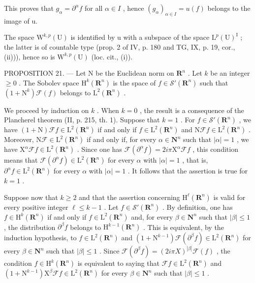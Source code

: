 This proves that \(g_{\alpha} = \partial^{\alpha} f\) for all \(\alpha \in I\) , hence \((g_{\alpha})_{\alpha \in I} = u(f)\) belongs to the image of u.

The space \(\mathrm{W}^{k,p}(\mathrm{U})\) is identified by u with a subspace of the space \(\mathrm{L}^{p}(\mathrm{U})^{\mathrm{I}}\) ; the latter is of countable type (prop. 2 of IV, p. 180 and TG, IX, p. 19, cor., (ii))), hence so is \(\mathrm{W}^{k,p}(\mathrm{U})\) (loc. cit., (i)).

PROPOSITION 21. --- Let N be the Euclidean norm on \(\mathbf{R}^{n}\) . Let \(k\) be an integer \(\geqslant 0\) . The Sobolev space \(\mathrm{H}^{k}(\mathbf{R}^{n})\) is the space of \(f \in \mathcal{S}'(\mathbf{R}^{n})\) such that \((1 + \mathrm{N}^{k})\mathcal{F}(f)\) belongs to \(\mathrm{L}^{2}(\mathbf{R}^{n})\) .

We proceed by induction on \(k\) . When \(k = 0\) , the result is a consequence of the Plancherel theorem (II, p. 215, th. 1). Suppose that \(k = 1\) . For \(f \in \mathcal{S}'(\mathbf{R}^n)\) , we have \((1 + \mathrm{N})\mathcal{F}f \in \mathrm{L}^2(\mathbf{R}^n)\) if and only if \(f \in \mathrm{L}^2(\mathbf{R}^n)\) and \(\mathrm{N}\mathcal{F}f \in \mathrm{L}^2(\mathbf{R}^n)\) . Moreover, \(\mathrm{N}\mathcal{F} \in \mathrm{L}^2(\mathbf{R}^n)\) if and only if, for every \(\alpha \in \mathbf{N}^n\) such that \(|\alpha| = 1\) , we have \(\mathrm{X}^\alpha\mathcal{F}f \in \mathrm{L}^2(\mathbf{R}^n)\) . Since one has \(\mathcal{F}(\partial^\alpha f) = 2i\pi\mathrm{X}^\alpha\mathcal{F}f\) , this condition means that \(\mathcal{F}(\partial^\alpha f) \in \mathrm{L}^2(\mathbf{R}^n)\) for every \(\alpha\) with \(|\alpha| = 1\) , that is, \(\partial^\alpha f \in \mathrm{L}^2(\mathbf{R}^n)\) for every \(\alpha\) with \(|\alpha| = 1\) . It follows that the assertion is true for \(k = 1\) .

Suppose now that \(k \geqslant 2\) and that the assertion concerning \(\mathrm{H}^{\ell}(\mathbf{R}^{n})\) is valid for every positive integer \(\ell \leqslant k - 1\) . Let \(f \in \mathcal{S}'(\mathbf{R}^{n})\) . By definition, one has \(f \in \mathrm{H}^{k}(\mathbf{R}^{n})\) if and only if \(f \in \mathrm{L}^{2}(\mathbf{R}^{n})\) and, for every \(\beta \in \mathbf{N}^{n}\) such that \(|\beta| \leqslant 1\) , the distribution \(\partial^{\beta} f\) belongs to \(\mathrm{H}^{k-1}(\mathbf{R}^{n})\) . This is equivalent, by the induction hypothesis, to \(f \in \mathrm{L}^{2}(\mathbf{R}^{n})\) and \((1 + \mathrm{N}^{k-1})\mathcal{F}(\partial^{\beta} f) \in \mathrm{L}^{2}(\mathbf{R}^{n})\) for every \(\beta \in \mathbf{N}^{n}\) such that \(|\beta| \leqslant 1\) . Since \(\mathcal{F}(\partial^{\beta} f) = (2i\pi X)^{|\beta|}\mathcal{F}(f)\) , the condition \(f \in \mathrm{H}^{k}(\mathbf{R}^{n})\) is equivalent to saying that \(\mathcal{F}f \in \mathrm{L}^{2}(\mathbf{R}^{n})\) and \((1 + \mathrm{N}^{k-1})\mathrm{X}^{\beta}\mathcal{F}f \in \mathrm{L}^{2}(\mathbf{R}^{n})\) for every \(\beta \in \mathbf{N}^{n}\) such that \(|\beta| \leqslant 1\) .

